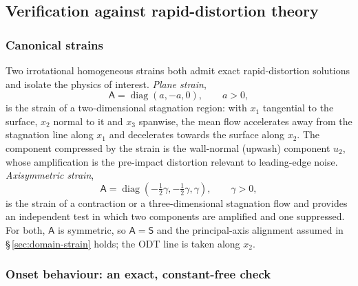 \documentclass[lineno]{JFM-FLM_Au}
\begin{document}
\subsection{Verification against rapid-distortion theory}\label{sec:verification}

\subsubsection{Canonical strains}

Two irrotational homogeneous strains both admit exact rapid-distortion
solutions and isolate the physics of interest. \emph{Plane strain},
\begin{equation}
  \mathsf{A}=\operatorname{diag}(a,-a,0),\qquad a>0,
  \label{eq:plane-strain}
\end{equation}
is the strain of a two-dimensional stagnation region: with $x_1$ tangential
to the surface, $x_2$ normal to it and $x_3$ spanwise, the mean flow
accelerates away from the stagnation line along $x_1$ and decelerates
towards the surface along $x_2$. The component compressed by the strain is
the wall-normal (upwash) component $u_2$, whose amplification is the
pre-impact distortion relevant to leading-edge noise. \emph{Axisymmetric
strain},
\begin{equation}
  \mathsf{A}=\operatorname{diag}(-\tfrac12\gamma,-\tfrac12\gamma,\gamma),
  \qquad \gamma>0,
  \label{eq:axi-strain}
\end{equation}
is the strain of a contraction or a three-dimensional stagnation flow and
provides an independent test in which two components are amplified and one
suppressed. For both, $\mathsf{A}$ is symmetric, so $\mathsf{A}=\mathsf{S}$
and the principal-axis alignment assumed in \S\,\ref{sec:domain-strain}
holds; the ODT line is taken along $x_2$.

\subsubsection{Onset behaviour: an exact, constant-free check}
\end{document}
